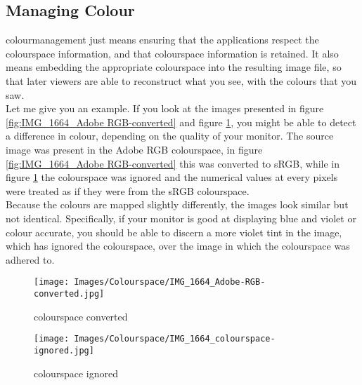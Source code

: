 \subsection{Managing Colour}

\Gls{colourmanagement} just means ensuring that the applications respect the \gls{colourspace} information, and that \gls{colourspace} information is retained. It also means embedding the appropriate \gls{colourspace} into the resulting image file, so that later viewers are able to reconstruct what you see, with the colours that you saw.
\\[\baselineskip]
Let me give you an example. If you look at the images presented in figure \ref{fig:IMG_1664_Adobe RGB-converted} and figure \ref{fig:IMG_1664_colourspace ignored}, you might be able to detect a difference in colour, depending on the quality of your monitor. The source image was present in the Adobe RGB \gls{colourspace}, in figure \ref{fig:IMG_1664_Adobe RGB-converted} this was converted to sRGB, while in figure \ref{fig:IMG_1664_colourspace ignored} the \gls{colourspace} was ignored and the numerical values at every pixels were treated as if they were from the sRGB \gls{colourspace}.
\\
Because the colours are mapped slightly differently, the images look similar but not identical. Specifically, if your monitor is good at displaying blue and violet or colour accurate, you should be able to discern a more violet tint in the image, which has ignored the \gls{colourspace}, over the image in which the \gls{colourspace} was adhered to.

\begin{figure}[htb]
\begin{minipage}{.5\textwidth}
	\centering
		\texttt{[image: Images/Colourspace/IMG\_1664\_Adobe-RGB-converted.jpg]}
	\caption{colourspace converted}
	\label{fig:IMG_1664_Adobe RGB-converted}
\end{minipage}
\begin{minipage}{.5\textwidth}
	\centering
		\texttt{[image: Images/Colourspace/IMG\_1664\_colourspace-ignored.jpg]}
	\caption{colourspace ignored}
	\label{fig:IMG_1664_colourspace ignored}
	\end{minipage}
\end{figure}

